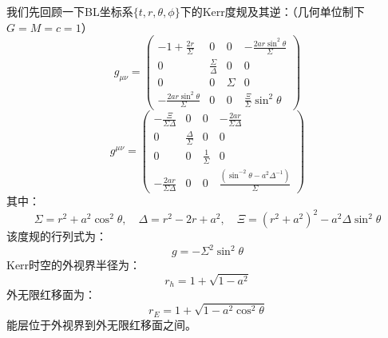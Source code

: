 \documentclass[lang=cn,color=blue,cm,11pt,scheme=chinese,bibend=bibtex,sorting=nty]{elegantbook}
\begin{document}
	我们先回顾一下BL坐标系$\{ t, r, \theta, \phi \}$下的Kerr度规及其逆：（几何单位制下$G = M = c = 1$）
	\begin{equation}
		g_{\mu \nu} = \begin{pmatrix}
			- 1 + \frac{2 r}{\Sigma} & 0 & 0 & - \frac{2 a r \sin^2 \theta}{\Sigma}\\
			0 & \frac{\Sigma}{\Delta} & 0 & 0\\
			0 & 0 & \Sigma & 0\\
			- \frac{2 a r \sin^2 \theta}{\Sigma} & 0 & 0 & \frac{\Xi}{\Sigma} \sin^2 \theta
		\end{pmatrix}
	\end{equation}
	\begin{equation}
		g^{\mu \nu} = \begin{pmatrix}
			- \frac{\Xi}{\Sigma \Delta} & 0 & 0 & - \frac{2 a r}{\Sigma \Delta}\\
			0 & \frac{\Delta}{\Sigma} & 0 & 0\\
			0 & 0 & \frac{1}{\Sigma} & 0\\
			- \frac{2 a r}{\Sigma \Delta} & 0 & 0 & \frac{(\sin^{- 2} \theta - a^2 \Delta^{- 1})}{\Sigma}
		\end{pmatrix}
	\end{equation}
	其中：
	\begin{equation}
		\Sigma = r^2 + a^2 \cos^2 \theta, \quad \Delta = r^2 - 2 r + a^2, \quad \Xi = (r^2 + a^2)^2 - a^2 \Delta \sin^2 \theta
	\end{equation}
	该度规的行列式为：
	\begin{equation}
		g = - \Sigma^2 \sin^2 \theta
	\end{equation}
	Kerr时空的外视界半径为：
	\begin{equation}
		r_h = 1 + \sqrt{1 - a^2}
	\end{equation}
	外无限红移面为：
	\begin{equation}
		r_E = 1 + \sqrt{1 - a^2 \cos^2 \theta}
	\end{equation}
	能层位于外视界到外无限红移面之间。
	
\end{document}
